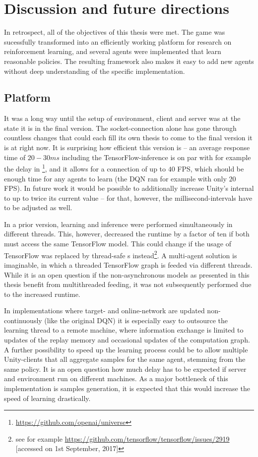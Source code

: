 \chapter{Discussion and future directions}

In retrospect, all of the objectives of this thesis were met. The game was sucessfully transformed into an efficiently working platform for research on reinforcement learning, and several agents were implemented that learn reasonable policies. The resulting framework also makes it easy to add new agents without deep understanding of the specific implementation.

\section{Platform}

It was a long way until the setup of environment, client and server was at the state it is in the final version. The socket-connection alone has gone through countless changes that could each fill its own thesis to come to the final version it is at right now. It is surprising how efficient this version is -- an average response time of $20-30ms$ including the TensorFlow-inference is on par with for example the delay in \footnote{\url{https://github.com/openai/universe}}, and it allows for a connection of up to $40$ FPS, which should be enough time for any agents to learn (the DQN ran for example with only $20$ FPS). In future work it would be possible to additionally increase Unity's internal  to up to twice its current value -- for that, however, the millisecond-intervals have to be adjusted as well.

In a prior version, learning and inference were performed simultaneously in different threads. This, however, decreased the runtime by a factor of ten if both must access the same TensorFlow model. This could change if the usage of TensorFlow  was  replaced by thread-safe s instead\footnote{see for example \url{https://github.com/tensorflow/tensorflow/issues/2919} [accessed on 1st September, 2017]}. A multi-agent solution is imaginable, in which a threaded TensorFlow graph is feeded via different threads. While it is an open question if the non-asynchronous models as presented in this thesis benefit from multithreaded feeding, it was not subsequently performed due to the increased runtime. 

In implementations where target- and online-network are updated non-continuously (like the original DQN) it is especially easy to outsource the learning thread to a remote machine, where information exchange is limited to updates of the replay memory and occasional updates of the computation graph. A further possibility to speed up the learning process could be to allow multiple Unity-clients that all aggregate samples for the same agent, stemming from the same policy. It is an open question how much delay has to be expected if server and environment run on different machines. As a major bottleneck of this implementation is samples generation, it is expected that this would increase the speed of learning drastically.

